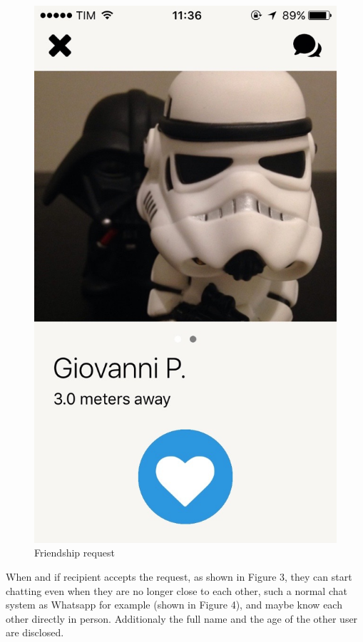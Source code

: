\begin{multicols}{2}
\begin{figure}[H]
\centering
\includegraphics[scale=0.15]{./images/friendship_req.jpg}
\caption{\label{Friendship request}Friendship request}
\end{figure}
\end{multicols}

When and if recipient accepts the request, as shown in Figure 3, they can start chatting even when they are no longer close to each other, such a normal chat system as Whatsapp for example (shown in Figure 4), and maybe know each other directly in person. Additionaly the full name and the age of the other user are disclosed.

